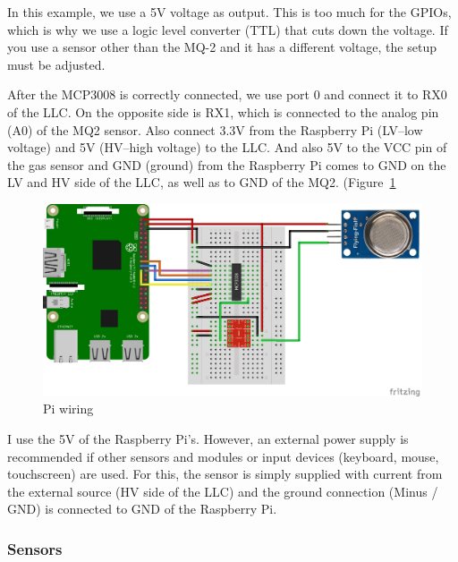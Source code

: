 \documentclass{article}\usepackage[]{graphicx}\usepackage[]{color}
\begin{document}
In this example, we use a 5V voltage as output. This is too much for the GPIOs, which is why we use a logic level converter (TTL) that cuts down the voltage. If you use a sensor other than the MQ-2 and it has a different voltage, the setup must be adjusted.

After the MCP3008 is correctly connected, we use port 0 and connect it to RX0 of the LLC. On the opposite side is RX1, which is connected to the analog pin (A0) of the MQ2 sensor. Also connect 3.3V from the Raspberry Pi (LV--low voltage) and 5V (HV--high voltage) to the LLC. And also 5V to the VCC pin of the gas sensor and GND (ground) from the Raspberry Pi comes to GND on the LV and HV side of the LLC, as well as to GND of the MQ2. (Figure~\ref{fig:Pi-MQ2}

\begin{figure}
\includegraphics[width=1.00\textwidth]{Raspberry-Pi-Gas-Sensor-MQ2.png}
\caption{Pi wiring}
\label{fig:Pi-MQ2}
\end{figure}

I use the 5V of the Raspberry Pi's. However, an external power supply is recommended if other sensors and modules or input devices (keyboard, mouse, touchscreen) are used. For this, the sensor is simply supplied with current from the external source (HV side of the LLC) and the ground connection (Minus / GND) is connected to GND of the Raspberry Pi.

\subsubsection{Sensors}
\end{document}
